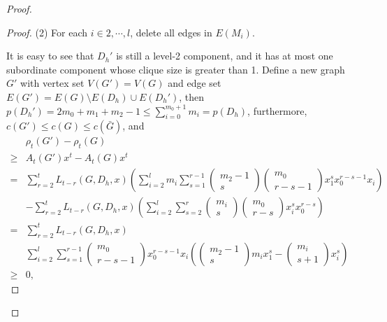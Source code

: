 \documentclass[10pt,a4paper]{amsart}
\begin{document}
\begin{proof}
\begin{proof}
                \noindent (2) For each $i \in {2, \cdots, l}$, delete all edges in $E(M_i)$.

                It is easy to see that $D_h'$ is still a level-2 component, and it has at most one subordinate component whose clique size is greater than 1. Define a new graph $G'$ with vertex set $V(G') = V(G)$ and edge set $E(G') = E(G) \setminus E(D_h) \cup E(D_h')$, then $p(D_h') = 2m_0+m_1+m_2-1 \leq \sum_{i=0}^{m_0+1}m_i = p(D_h)$, furthermore, $c(G') \leq c(G) \leq c(\bar{G})$, and
                    \begin{align*}
                        &\rho_t(G')-\rho_t(G)
                        \\\geq & A_t(G')x^t-A_t(G)x^t
                        \\= &\sum_{r=2}^t L_{t-r}(G, D_h, x) \left( \sum_{i=2}^l m_i \sum_{s=1}^{r-1} \begin{pmatrix}m_2-1\\s\end{pmatrix} \begin{pmatrix}m_0\\r-s-1\end{pmatrix}x_1^sx_0^{r-s-1}x_i \right)\\
                        &- \sum_{r=2}^t L_{t-r}(G, D_h, x) \left( \sum_{i=2}^l \sum_{s=2}^{r} \begin{pmatrix}m_i\\s\end{pmatrix} \begin{pmatrix}m_0\\r-s\end{pmatrix}x_i^{s}x_0^{r-s} \right)
                        \\= &\sum_{r=2}^t L_{t-r}(G, D_h, x) \\
                        &\sum_{i=2}^l \sum_{s=1}^{r-1}\begin{pmatrix}m_0\\r-s-1\end{pmatrix}x_0^{r-s-1}x_i\left( \begin{pmatrix}m_2-1\\s\end{pmatrix}m_ix_1^s-\begin{pmatrix}m_i\\s+1\end{pmatrix}x_i^s \right)
                        \\\geq &0,
                    \end{align*}


\end{proof}
\end{proof}
\end{document}
